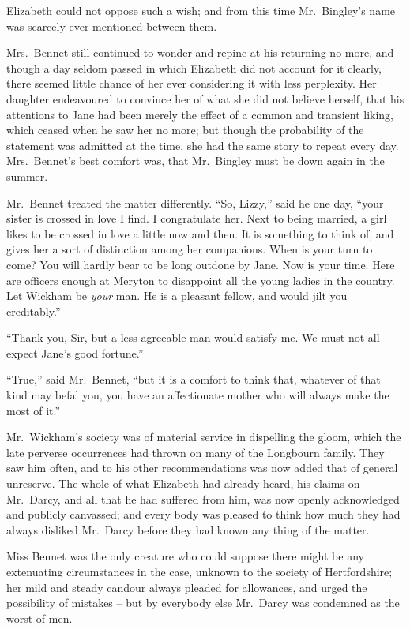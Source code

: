 Elizabeth could not oppose such a wish; and from this
time Mr.\ Bingley’s name was scarcely ever mentioned
between them.

Mrs.\ Bennet still continued to wonder and repine at
his returning no more, and though a day seldom passed
in which Elizabeth did not account for it clearly, there
seemed little chance of her ever considering it with less
perplexity. Her daughter endeavoured to convince her
of what she did not believe herself, that his attentions
to Jane had been merely the effect of a common and
transient liking, which ceased when he saw her no more;
but though the probability of the statement was admitted
at the time, she had the same story to repeat every day.
Mrs.\ Bennet’s best comfort was, that Mr.\ Bingley must
be down again in the summer.

Mr.\ Bennet treated the matter differently. “So,
Lizzy,” said he one day, “your sister is crossed in love
I find. I congratulate her. Next to being married, a girl
likes to be crossed in love a little now and then. It is
something to think of, and gives her a sort of distinction
among her companions. When is your turn to come?
You will hardly bear to be long outdone by Jane. Now
is your time. Here are officers enough at Meryton to
disappoint all the young ladies in the country. Let
Wickham be \textit{your} man. He is a pleasant fellow, and would
jilt you creditably.”

“Thank you, Sir, but a less agreeable man would satisfy
me. We must not all expect Jane’s good fortune.”

“True,” said Mr.\ Bennet, “but it is a comfort to think
that, whatever of that kind may befal you, you have an
affectionate mother who will always make the most of it.”

Mr.\ Wickham’s society was of material service in dispelling
the gloom, which the late perverse occurrences had
thrown on many of the Longbourn family. They saw
him often, and to his other recommendations was now
added that of general unreserve. The whole of what
Elizabeth had already heard, his claims on Mr.\ Darcy,
and all that he had suffered from him, was now openly
acknowledged and publicly canvassed; and every body
was pleased to think how much they had always disliked
Mr.\ Darcy before they had known any thing of the matter.

Miss Bennet was the only creature who could suppose
there might be any extenuating circumstances in the case,
unknown to the society of Hertfordshire; her mild and
steady candour always pleaded for allowances, and urged
the possibility of mistakes -- but by everybody else
Mr.\ Darcy was condemned as the worst of men.

